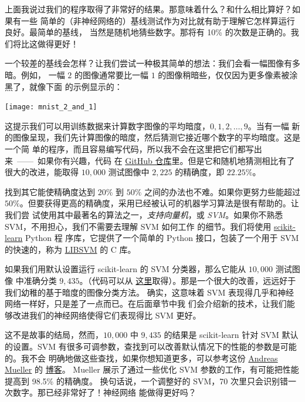 

上面我说过我们的程序取得了非常好的结果。那意味着什么？和什么相比算好？如果有一些
简单的（非神经网络的）基线测试作为对比就有助于理解它怎样算运行良好。最简单的基线，
当然是随机地猜些数字。那将有 10\% 的次数是正确的。我们将比这做得更好！

一个较差的基线会怎样？让我们尝试一种极其简单的想法：我们会看一幅图像有多暗。例如，
一幅 $2$ 的图像通常要比一幅 $1$ 的图像稍暗些，仅仅因为更多像素被涂黑了，就像下面
的示例显示的：
\begin{center}
  \texttt{[image: mnist\_2\_and\_1]}
\end{center}

这提示我们可以用训练数据来计算数字图像的平均暗度，$0, 1, 2,\ldots, 9$。当有一幅
新的图像呈现，我们先计算图像的暗度，然后猜测它接近哪个数字的平均暗度。这是一个简
单的程序，而且容易编写代码，所以我不会在这里把它们都写出来~——~如果你有兴趣，代码
在
\href{https://github.com/mnielsen/neural-networks-and-deep-learning/blob/master/src/mnist_average_darkness.py}{GitHub
  仓库}里。但是它和随机地猜测相比有了很大的改进，能取得 $10,000$ 测试图像中
$2,225$ 的精确度，即 $22.25\%$。

找到其它能使精确度达到 $20\%$ 到 $50\%$ 之间的办法也不难。如果你更努力些能超过
$50\%$。但要获得更高的精确度，采用已经被认可的机器学习算法是很有帮助的。让我们尝
试使用其中最著名的算法之一，\emph{支持向量机}，或
\emph{SVM}。如果你不熟悉 SVM，不用担心，我们不需要去理解 SVM 如何工作
的细节。我们将使用 \href{http://scikit-learn.org/stable/}{scikit-learn} Python 程
序库，它提供了一个简单的 Python 接口，包装了一个用于 SVM 的快速的，称为
\href{http://www.csie.ntu.edu.tw/~cjlin/libsvm/}{LIBSVM} 的 C 库。

如果我们用默认设置运行 scikit-learn 的 SVM 分类器，那么它能从 $10,000$ 测试图像
中准确分类 $9,435$。（代码可以从%
  \href{https://github.com/mnielsen/neural-networks-and-deep-learning/blob/master/src/mnist_svm.py}{
    这里}取得）。那是一个很大的改善，远远好于我们幼稚的基于暗度的图像分类方法。
确实，这意味着 SVM 表现得几乎和神经网络一样好，只是差了一点而已。在后面章节中我
们会介绍新的技术，让我们能够改进我们的神经网络使得它们表现得比 SVM 更好。

这不是故事的结局，然而，$10,000$ 中 $9,435$ 的结果是 scikit-learn 针对 SVM 默认
的设置。SVM 有很多可调参数，查找到可以改善默认情况下的性能的参数是可能的。我不会
明确地做这些查找，如果你想知道更多，可以参考这份
\href{http://peekaboo-vision.blogspot.ca/}{Andreas Mueller} 的%
\href{http://peekaboo-vision.blogspot.de/2010/09/mnist-for-ever.html}{博客}。
Mueller 展示了通过一些优化 SVM 参数的工作，有可能把性能提高到 98.5\% 的精确度。
换句话说，一个调整好的 SVM，70 次里只会识别错一次数字。那已经非常好了！神经网络
能做得更好吗？

